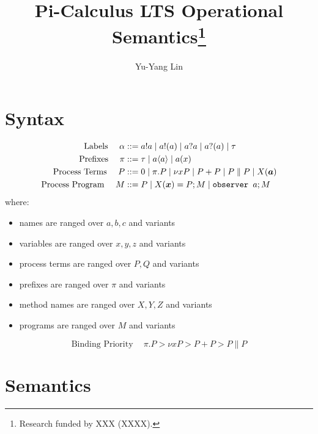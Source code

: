 \documentclass[envcountsame,runningheads,orivec]{llncs}
\begin{document}
%
\title{Pi-Calculus LTS Operational Semantics\thanks{Research funded by XXX (XXXX).}}
%
%
\author{Yu-Yang Lin}
%
%
%
\maketitle              %
%
\begin{abstract}

\end{abstract}
%
%
%
%


\section{Syntax}

\begin{align*}
\text{Labels} \quad~\alpha &::= a!a \mid a!(a) \mid a?a \mid a?(a) \mid \tau \\
\text{Prefixes} \quad~ \pi &::= \tau \mid a \pair{a} \mid a (x)\\
\text{Process Terms} \quad~ P &::= 0 \mid \pi . P \mid \nu x P \mid P + P \mid P\parallel P \mid X(\vec a)\\
\text{Process Program} \quad~ M &::= P \mid X(\vec x) = P ; M \mid \texttt{observer }a ; M
\end{align*}
where:
\begin{itemize}
\item names are ranged over $a,b,c$ and variants
\item variables are ranged over $x,y,z$ and variants
\item process terms are ranged over $P,Q$ and variants
\item prefixes are ranged over $\pi$ and variants
\item method names are ranged over $X,Y,Z$ and variants
\item programs are ranged over $M$ and variants
\end{itemize}
\[
\text{Binding Priority} \quad~ \pi.P > \nu x P > P + P > P\parallel P
\]

\section{Semantics}
\end{document}

